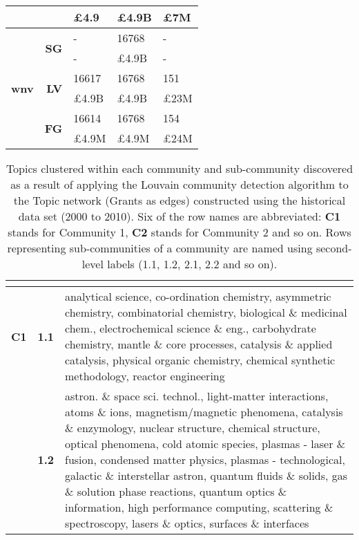 \begin{table}[!htbp]
\begin{tabular}{r|r|>{\raggedleft\arraybackslash}p{3.5cm}|>{\raggedleft\arraybackslash}p{3.2cm}|>{\raggedleft\arraybackslash}p{3.5cm}}
& {} & {\pounds4.9} & {\pounds4.9B} & {\pounds7M}\\
\hline
\multirow{6}{*}{\textbf{wnv}}
& \multirow{2}{*}{\textbf{SG}}
& {-} & {16768} & {-}\\
& {} & {-} & {\pounds4.9B} & {-}\\
\cline{2-5}
& \multirow{2}{*}{\textbf{LV}}
& {16617} & {16768} & {151}\\
& {} & {\pounds4.9B} & {\pounds4.9B} & {\pounds23M}\\
\cline{2-5}
& \multirow{2}{*}{\textbf{FG}}
& {16614} & {16768} & {154}\\
& {} & {\pounds4.9M} & {\pounds4.9M} & {\pounds24M}
\end{tabular}
\end{table}

\begin{spacing}{0.9}
\begin{longtable}[r]{r|r|p{11.5cm}}
\caption[Topics clustered within each community and sub-community discovered in the Topic network (Grants as edges) constructed using the historical data set (2000 to 2010)]{Topics clustered within each community and sub-community discovered as a result of applying the Louvain community detection algorithm to the Topic network (Grants as edges) constructed using the historical data set (2000 to 2010). Six of the row names are abbreviated: \textbf{C1} stands for Community 1, \textbf{C2} stands for Community 2 and so on. Rows representing sub-communities of a community are named using second-level labels (1.1, 1.2, 2.1, 2.2 and so on).}\\
\label{table:topic_a_past1_clusters_appendix}
{} & {}\\
\hline
\endhead
\textbf{C1}
& \textbf{1.1} & {analytical science, co-ordination chemistry, asymmetric chemistry, combinatorial chemistry, biological \& medicinal chem., electrochemical science \& eng., carbohydrate chemistry, mantle \& core processes, catalysis \& applied catalysis, physical organic chemistry, chemical synthetic methodology, reactor engineering}\\
& \textbf{1.2} & {astron. \& space sci. technol., light-matter interactions, atoms \& ions, magnetism/magnetic phenomena, catalysis \& enzymology, nuclear structure, chemical structure, optical phenomena, cold atomic species, plasmas - laser \& fusion, condensed matter physics, plasmas - technological, galactic \& interstellar astron, quantum fluids \& solids, gas \& solution phase reactions, quantum optics \& information, high performance computing, scattering \& spectroscopy, lasers \& optics, surfaces \& interfaces}\\

\end{longtable}
\end{spacing}
